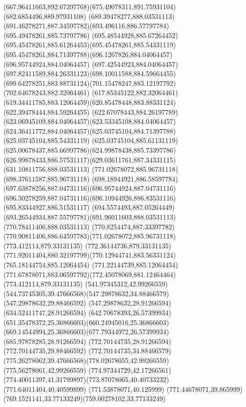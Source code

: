 {{	\curveto(667.96411663,892.67397768)(675.49078311,891.75931104)(682.6854496,889.97931108)
	\moveto(689.39478277,888.03531113)
	\curveto(691.46278271,887.34597782)(693.496116,886.57797784)(695.49478261,885.73797786)
	\curveto(695.48544928,885.67264452)(695.45478261,885.61264453)(695.45478261,885.54331119)
	\curveto(695.45478261,884.71397788)(696.1267826,884.04064457)(696.95744924,884.04064457)
	\curveto(697.42544923,884.04064457)(697.82411589,884.26331123)(698.10011588,884.59664455)
	\curveto(699.64278251,883.88731124)(701.15478247,883.12197792)(702.64678243,882.32064461)
	\lineto(617.85345122,882.32064461)
	\curveto(619.34411785,883.12064459)(620.85478448,883.88331124)(622.39478444,884.59264455)
	\curveto(622.67078443,884.26197789)(623.06945109,884.04064457)(623.53345108,884.04064457)
	\curveto(624.36411772,884.04064457)(625.03745104,884.71397788)(625.03745104,885.54331119)
	\curveto(625.03745104,885.61131119)(625.00678437,885.66997786)(624.99878438,885.73397786)
	\curveto(626.99878433,886.57531117)(629.03611761,887.34331115)(631.10811756,888.03531113)
	\closepath
	\moveto(771.02678072,885.96731118)
	\lineto(698.37611587,885.96731118)
	\curveto(698.18944921,886.58597784)(697.63878256,887.04731116)(696.95744924,887.04731116)
	\curveto(696.50278259,887.04731116)(696.10944926,886.83531116)(695.83344927,886.51531117)
	\curveto(694.5574493,887.05264449)(693.26544934,887.55797781)(691.96011603,888.03531113)
	\lineto(770.78411406,888.03531113)
	\curveto(770.8254474,887.33397782)(770.90811406,886.64597783)(771.02678072,885.96731118)
	\moveto(773.412114,879.33131135)
	\lineto(772.36144736,879.33131135)
	\curveto(771.92011404,880.32197799)(770.12944741,883.56331124)(765.18144754,885.12064454)
	\lineto(771.22144739,885.12064454)
	\curveto(771.67878071,883.06597792)(772.45078069,881.12464464)(773.412114,879.33131135)
	\moveto(541.97345312,42.99266559)
	\curveto(544.73745305,39.47666568)(547.29878632,34.88466579)(547.29878632,29.88466592)
	\lineto(547.29878632,28.91266594)
	\lineto(634.52411747,28.91266594)
	\curveto(642.70678393,26.57399934)(651.35478372,25.36866603)(660.24945016,25.36866603)
	\curveto(669.14544994,25.36866603)(677.79344972,26.57399934)(685.97878285,28.91266594)
	\lineto(772.70144735,28.91266594)
	\lineto(772.70144735,29.88466592)
	\curveto(772.70144735,34.88466579)(775.26278062,39.47666568)(778.02678055,42.99266559)
	\lineto(775.56278061,42.99266559)
	\curveto(774.97344729,42.17266561)(774.40011397,41.31799897)(773.87078065,40.40733232)
	\lineto(771.64011404,40.40599899)
	\lineto(771.53878071,40.125999)
	\curveto(771.44678071,39.865999)(769.1521141,33.77133249)(759.00278102,33.77133249)
}}
